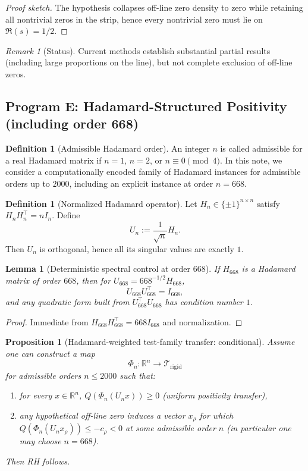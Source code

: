 \documentclass[11pt]{article}
\theoremstyle{plain}
\newtheorem{proposition}[theorem]{Proposition}
\newtheorem{lemma}[theorem]{Lemma}
\theoremstyle{definition}
\newtheorem{definition}[theorem]{Definition}
\theoremstyle{remark}
\newtheorem{remark}[theorem]{Remark}
\begin{document}
\begin{proof}[Proof sketch]
The hypothesis collapses off-line zero density to zero while retaining all nontrivial zeros in the strip,
hence every nontrivial zero must lie on $\Re(s)=1/2$.
\end{proof}

\begin{remark}[Status]
Current methods establish substantial partial results (including large proportions on the line),
but not complete exclusion of off-line zeros.
\end{remark}

\subsection{Program E: Hadamard-Structured Positivity (including order 668)}

\begin{definition}[Admissible Hadamard order]
An integer $n$ is called admissible for a real Hadamard matrix if $n=1$, $n=2$, or $n\equiv 0\pmod 4$.
In this note, we consider a computationally encoded family of Hadamard instances for admissible orders
up to $2000$, including an explicit instance at order $n=668$.
\end{definition}

\begin{definition}[Normalized Hadamard operator]
Let $H_n\in\{\pm 1\}^{n\times n}$ satisfy $H_nH_n^{\top}=nI_n$.
Define
\[
U_n:=\frac{1}{\sqrt n}H_n.
\]
Then $U_n$ is orthogonal, hence all its singular values are exactly $1$.
\end{definition}

\begin{lemma}[Deterministic spectral control at order $668$]
If $H_{668}$ is a Hadamard matrix of order $668$, then for $U_{668}=668^{-1/2}H_{668}$,
\[
U_{668}U_{668}^{\top}=I_{668},
\]
and any quadratic form built from $U_{668}^{\top}U_{668}$ has condition number $1$.
\end{lemma}

\begin{proof}
Immediate from $H_{668}H_{668}^{\top}=668I_{668}$ and normalization.
\end{proof}

\begin{proposition}[Hadamard-weighted test-family transfer: conditional]
Assume one can construct a map
\[
\Phi_n:\mathbb{R}^n\to \mathcal{T}_{\mathrm{rigid}}
\]
for admissible orders $n\le 2000$ such that:
\begin{enumerate}
  \item for every $x\in\mathbb{R}^n$, $Q(\Phi_n(U_nx))\ge 0$ (uniform positivity transfer),
  \item any hypothetical off-line zero induces a vector $x_\rho$ for which
  $Q(\Phi_n(U_nx_\rho))\le -c_\rho<0$ at some admissible order $n$ (in particular one may choose $n=668$).
\end{enumerate}
Then RH follows.
\end{proposition}
\end{document}
